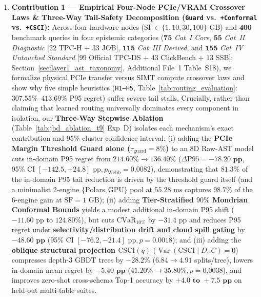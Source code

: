 \documentclass[10pt,a4paper]{article}
\begin{document}
\begin{enumerate}[leftmargin=1.5em,itemsep=1.5pt]
    \item \textbf{Contribution 1 --- Empirical Four-Node PCIe/VRAM Crossover Laws \& Three-Way Tail-Safety Decomposition (\texttt{Guard} vs.\ \texttt{+Conformal} vs.\ \texttt{+CSCI}):} Across four hardware nodes ($\text{SF}\in\{1,10,30,100\}\text{ GB}$) and $\mathbf{400}$ benchmark queries in four epistemic categories ($\mathbf{75}$ \emph{Cat~I Core}, $\mathbf{55}$ \emph{Cat~II Diagnostic} [$22$ TPC-H $+$ $33$ JOB], $\mathbf{115}$ \emph{Cat~III Derived}, and $\mathbf{155}$ \emph{Cat~IV Untouched Standard} [$99$ Official TPC-DS $+$ $43$ ClickBench $+$ $13$ SSB]; Section~\ref{sec:layer1_ast_taxonomy}, Additional File~1 Table~S18), we formalize physical PCIe transfer versus SIMT compute crossover laws and show why five simple heuristics (\texttt{H1--H5}, Table~\ref{tab:routing_evaluation}: $307.55\%\text{--}413.69\%$ P95 regret) suffer severe tail stalls. Crucially, rather than claiming that learned routing universally dominates every component in isolation, our \textbf{Three-Way Stepwise Ablation} (Table~\ref{tab:jbd_ablation_t9} Exp~D) isolates each mechanism's exact contribution and 95\% cluster confidence interval: (i) adding the \textbf{PCIe Margin Threshold Guard alone ($\tau_{\text{guard}}=8\%$)} to an 8D Raw-AST model cuts in-domain P95 regret from $214.60\%\rightarrow \mathbf{136.40\%}$ ($\Delta\text{P95}=\mathbf{-78.20\text{ pp}}$, 95\% CI $[-142.5,-24.8]\text{ pp}, p_{\text{Webb}}=0.0082$), demonstrating that $\mathbf{81.3\%}$ of the in-domain P95 tail reduction is driven by the threshold guard itself (and a minimalist 2-engine $\{\text{Polars},\text{GPU}\}$ pool at $55.28\text{ ms}$ captures $\mathbf{98.7\%}$ of the 6-engine gain at $\text{SF}=1\text{ GB}$); (ii) adding \textbf{Tier-Stratified $90\%$ Mondrian Conformal Bounds} yields a modest additional in-domain P95 shift ($-11.60\text{ pp}$ to $124.80\%$), but cuts $\text{CVaR}_{10\%}$ by $-31.4\text{ pp}$ and reduces P95 regret under \textbf{selectivity/distribution drift and cloud spill gating} by $\mathbf{-48.60\text{ pp}}$ (95\% CI $[-76.2,-21.4]\text{ pp}, p=0.0018$); and (iii) adding the \textbf{oblique structural projection $\text{CSCI}(q)$} ($\operatorname{Var}(\text{CSCI}\mid D..C)=0$) compresses depth-3 GBDT trees by $\mathbf{-28.2\%}$ ($6.84\rightarrow 4.91$ splits/tree), lowers in-domain mean regret by $\mathbf{-5.40\text{ pp}}$ ($41.20\%\rightarrow 35.80\%, p=0.0038$), and improves zero-shot cross-schema Top-1 accuracy by $\mathbf{+4.0\text{ to }+7.5\text{ pp}}$ on held-out multi-table suites.

\end{enumerate}
\end{document}
